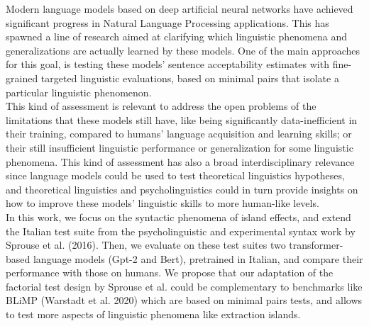 
\normalsize
Modern language models based on deep artificial neural networks have achieved significant progress in Natural Language Processing applications. This has spawned a line of research aimed at clarifying which linguistic phenomena and generalizations are actually learned by these models. One of the main approaches for this goal, is testing these models' sentence acceptability estimates with fine-grained targeted linguistic evaluations, based on minimal pairs that isolate a particular linguistic phenomenon.\\

This kind of assessment is relevant to address the open problems of the limitations that these models still have, like being significantly data-inefficient in their training, compared to humans’ language acquisition and learning skills; or their still insufficient linguistic performance or generalization for some linguistic phenomena. This kind of assessment has also a broad interdisciplinary relevance since language models could be used to test theoretical linguistics hypotheses, and theoretical linguistics and psycholinguistics could in turn provide insights on how to improve these models' linguistic skills to more human-like levels.\\ 

In this work, we focus on the syntactic phenomena of island effects, and extend the Italian test suite from the psycholinguistic and experimental syntax work by Sprouse et al. (2016). Then,  we evaluate on these test suites two transformer-based language models (Gpt-2 and Bert), pretrained in Italian, and compare their performance with those on humans. We propose that our adaptation of the factorial test design by Sprouse et al. could be complementary to benchmarks like BLiMP (Warstadt et al. 2020) which are based on minimal pairs tests, and allows to test more aspects of linguistic phenomena like extraction islands.


